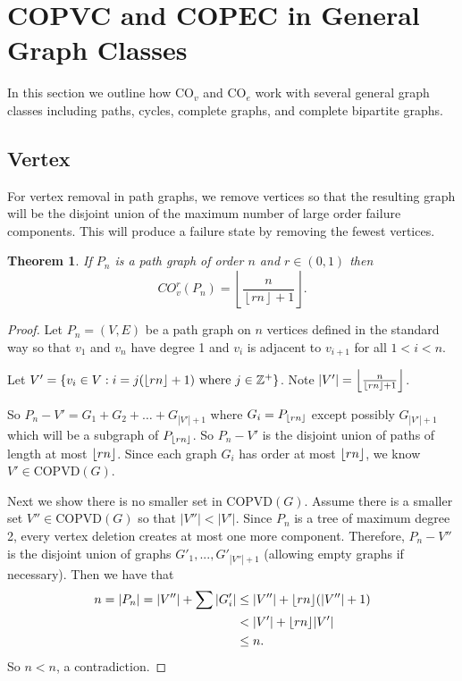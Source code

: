\documentclass[12pt]{article}
\DeclarePairedDelimiter{\floor}{\lfloor}{\rfloor}
\newtheorem{theorem}{Theorem}[section]
\theoremstyle{definition}
\newcommand{\BZ}{\mathbb Z}
\newcommand{\COVDS}{\text{COPVD}}
\begin{document}
\section{COPVC and COPEC in General Graph Classes}


In this section we outline how $\text{CO}_v$ and $\text{CO}_e$ work with several general graph classes including paths, cycles, complete graphs, and complete bipartite graphs. 



\subsection{Vertex}
For vertex removal in path graphs, we remove vertices so that the resulting graph will be the disjoint union of the maximum number of large order failure components. This will produce a failure state by removing the fewest vertices.  

\begin{theorem} \label{PathCOPVC}
 If $P_n$ is a path graph of order $n$ and $r \in (0,1)$ then  $$CO_v^{r}(P_n)=\left\lfloor \dfrac{n}{\left\lfloor rn\right\rfloor+1} \right\rfloor.$$ 
\end{theorem}
\begin{proof}
Let $P_n = (V, E)$ be a path graph on $n$ vertices defined in the standard way so that $v_1$ and $v_n$ have degree 1 and $v_i$ is adjacent to $v_{i+1}$ for all $1 < i < n$. 

Let $V' = \{v_i \in V: i = j(\floor{rn}+1) \text{ where } j \in \BZ^+ \}$. Note $|V'|=\left\lfloor \frac{n}{\floor{rn}+1} \right\rfloor$.

So $P_n-V' = G_1 + G_2 + \ldots + G_{|V'|+1}$
where $G_i = P_{\floor{rn}}$ except possibly $G_{|V'|+1}$ which will be a subgraph of $P_{\floor{rn}}$. So $P_n-V'$ is the disjoint union of paths of length at most $\floor{rn}$. Since each graph $G_i$ has order at most $\floor{rn}$, we know $V' \in \COVDS(G)$. 

Next we show there is no smaller set in $\COVDS(G)$. 
Assume there is a smaller set $V'' \in \COVDS(G)$ so that $|V''| < |V'|.$
Since $P_n$ is a tree of maximum degree 2, every vertex deletion creates at most one more component. Therefore, $P_{n}-V''$ is the disjoint union of graphs $G'_{1},...,G'_{|V''|+1}$ (allowing empty graphs if necessary). Then we have that 
\begin{align*}
  n=|P_{n}|=|V''| + \sum |G'_{i}|&\le |V''| + \floor{rn}(|V''|+1)\\
  & < |V'|+\floor{rn}|V'|\\
  & \le n.
\end{align*}
So $n<n$, a contradiction. 
\end{proof}
\end{document}
